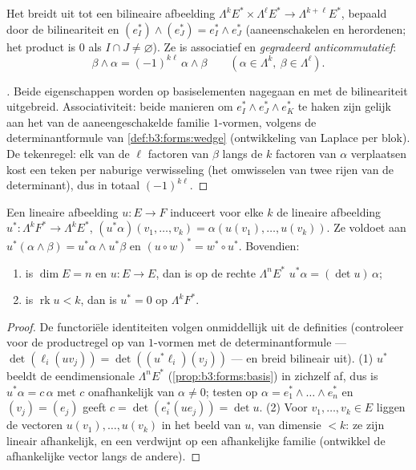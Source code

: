 \begin{definition}\label{def:b3:forms:wedgegeneral}
Het  breidt uit tot een bilineaire afbeelding
$\Lambda^kE^* \times \Lambda^\ell E^* \to \Lambda^{k+\ell}E^*$,
bepaald door de bilineariteit en $(e_I^*) \wedge (e_J^*) = e_I^*
\wedge e_J^*$ (aaneenschakelen en herordenen; het product is $0$
als $I \cap J \neq \varnothing$). Ze is associatief en
\emph{gegradeerd anticommutatief}:
\[
\beta \wedge \alpha = (-1)^{k\ell}\,\alpha \wedge \beta
\qquad (\alpha \in \Lambda^k, \ \beta \in \Lambda^\ell).
\]
\end{definition}

\begin{proof}[\omnameProof]
Beide eigenschappen worden op basiselementen nagegaan en met de
bilineariteit uitgebreid. Associativiteit: beide manieren om
$e_I^* \wedge e_J^* \wedge e_K^*$ te haken zijn gelijk aan het
 van de aaneengeschakelde familie $1$-vormen,
volgens de determinantformule van \cref{def:b3:forms:wedge}
(ontwikkeling van Laplace per blok). De tekenregel: elk van de
$\ell$ factoren van $\beta$ langs de $k$ factoren van $\alpha$
verplaatsen kost een teken per naburige verwisseling (het
omwisselen van twee rijen van de determinant), dus in totaal
$(-1)^{k\ell}$.
\end{proof}

\begin{proposition}
\label{prop:b3:forms:linearpullback}
Een lineaire afbeelding $u\colon E \to F$ induceert voor elke $k$
de lineaire afbeelding $u^*\colon \Lambda^kF^* \to \Lambda^kE^*$,
$(u^*\alpha)(v_1, \dots, v_k) = \alpha(u(v_1), \dots, u(v_k))$.
Ze voldoet aan $u^*(\alpha \wedge \beta) = u^*\alpha \wedge
u^*\beta$ en $(u \circ w)^* = w^* \circ u^*$. Bovendien:
\begin{enumerate}
  \item is $\dim E = n$ en $u\colon E \to E$, dan is op de rechte
        $\Lambda^nE^*$ $u^*\alpha = (\det u)\,\alpha$;
  \item is $\operatorname{rk}u < k$, dan is $u^* = 0$ op
        $\Lambda^kF^*$.
\end{enumerate}
\end{proposition}

\begin{proof}
De functoriële identiteiten volgen onmiddellijk uit de definities
(controleer voor de productregel op  van
$1$-vormen met de determinantformule --- $\det(\ell_i(uv_j)) =
\det((u^*\ell_i)(v_j))$ --- en breid bilineair uit).
(1) $u^*$ beeldt de eendimensionale $\Lambda^nE^*$
(\cref{prop:b3:forms:basis}) in zichzelf af, dus is $u^*\alpha =
c\,\alpha$ met $c$ onafhankelijk van $\alpha \neq 0$; testen op
$\alpha = e_1^* \wedge \dots \wedge e_n^*$ en $(v_j) = (e_j)$
geeft $c = \det(e_i^*(ue_j)) = \det u$.
(2) Voor $v_1, \dots, v_k \in E$ liggen de vectoren $u(v_1),
\dots, u(v_k)$ in het beeld van $u$, van dimensie $< k$: ze zijn
lineair afhankelijk, en een  verdwijnt op een
afhankelijke familie (ontwikkel de afhankelijke vector langs de
andere).
\end{proof}

